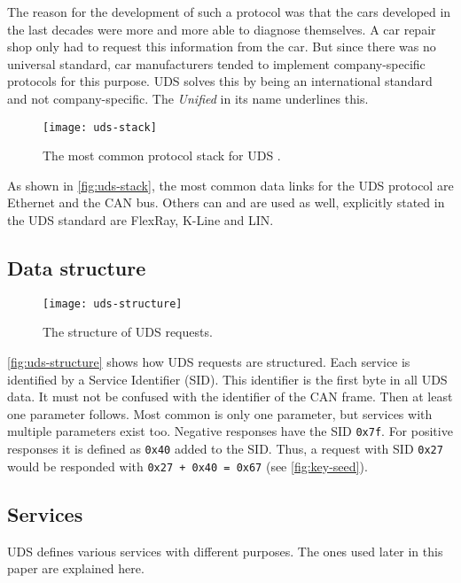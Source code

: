 The reason for the development of such a protocol was that the cars developed in the last decades were more and more able to diagnose themselves. A car repair shop only had to request this information from the car. But since there was no universal standard, car manufacturers tended to implement company-specific protocols for this purpose. UDS solves this by being an international standard and not company-specific. The \emph{Unified} in its name underlines this. 

\begin{figure}[htb]
    \centering
    \texttt{[image: uds-stack]}
    \caption{The most common protocol stack for UDS \cite{Weiss2020}.}
    \label{fig:uds-stack}
\end{figure}

As shown in \autoref{fig:uds-stack}, the most common data links for the UDS protocol are Ethernet and the CAN bus. Others can and are used as well, explicitly stated in the UDS standard are FlexRay, K-Line and LIN.

\subsection{Data structure}

\begin{figure}[htb]
    \centering
    \texttt{[image: uds-structure]}
    \caption{The structure of UDS requests.}
    \label{fig:uds-structure}
\end{figure}

\autoref{fig:uds-structure} shows how UDS requests are structured. Each service is identified by a Service Identifier (SID). This identifier is the first byte in all UDS data. It must not be confused with the identifier of the CAN frame. Then at least one parameter follows. Most common is only one parameter, but services with multiple parameters exist too.
Negative responses have the SID \texttt{0x7f}.
For positive responses it is defined as \texttt{0x40} added to the SID. Thus, a request with SID \texttt{0x27} would be responded with \texttt{0x27 + 0x40 = 0x67} (see \autoref{fig:key-seed}).

\subsection{Services}
\label{subsubsec:uds-services}

UDS defines various services with different purposes. The ones used later in this paper are explained here.

